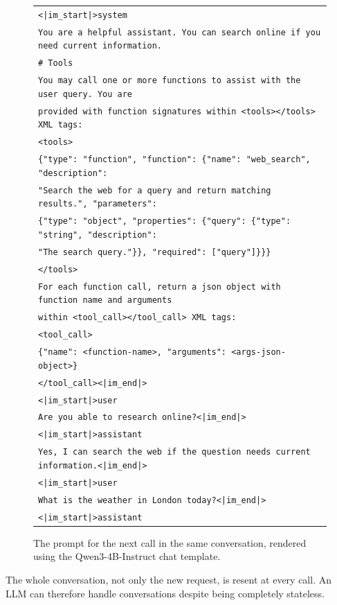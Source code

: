 \begin{figure}[htbp]
\centering
\scriptsize
\begin{tabularx}{\textwidth}{X}
\toprule
\texttt{<|im\_start|>system} \\
\texttt{You are a helpful assistant. You can search online if you need current information.} \\
\texttt{\# Tools} \\
\texttt{You may call one or more functions to assist with the user query. You are} \\
\texttt{provided with function signatures within <tools></tools> XML tags:} \\
\texttt{<tools>} \\
\texttt{\{"type": "function", "function": \{"name": "web\_search", "description":} \\
\texttt{"Search the web for a query and return matching results.", "parameters":} \\
\texttt{\{"type": "object", "properties": \{"query": \{"type": "string", "description":} \\
\texttt{"The search query."\}\}, "required": ["query"]\}\}\}} \\
\texttt{</tools>} \\
\texttt{For each function call, return a json object with function name and arguments} \\
\texttt{within <tool\_call></tool\_call> XML tags:} \\
\texttt{<tool\_call>} \\
\texttt{\{"name": <function-name>, "arguments": <args-json-object>\}} \\
\texttt{</tool\_call><|im\_end|>} \\
\texttt{<|im\_start|>user} \\
\texttt{Are you able to research online?<|im\_end|>} \\
\texttt{<|im\_start|>assistant} \\
\texttt{Yes, I can search the web if the question needs current information.<|im\_end|>} \\
\texttt{<|im\_start|>user} \\
\texttt{What is the weather in London today?<|im\_end|>} \\
\texttt{<|im\_start|>assistant} \\
\bottomrule
\end{tabularx}
\caption[Next-call prompt rendered with Qwen3-4B-Instruct chat template]{The prompt for the next call in the same conversation, rendered using the Qwen3-4B-Instruct chat template.}
\label{fig:rendered-example-2}
\end{figure}

The whole conversation, not only the new request, is resent at every call. An LLM can therefore handle conversations despite being completely stateless.
